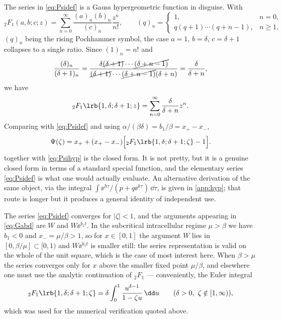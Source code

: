 The series in \cref{eq:Psidef} is a Gauss hypergeometric function in disguise. With
\begin{equation}
\label{eq:2F1def}
{}_2F_1(a,b;c;z) = \sum^\infty_{n=0}\frac{(a)_n(b)_n}{(c)_n}\frac{z^n}{n!},
\qquad
(q)_n = \begin{cases} 1, & n=0,\\ q(q+1)\cdots(q+n-1), & n\ge1,\end{cases}
\end{equation}
$(q)_n$ being the rising Pochhammer symbol, the case $a=1$, $b=\delta$, $c=\delta+1$
collapses to a single ratio. Since $(1)_n = n!$ and
\begin{equation}
\label{eq:pochcancel}
\frac{(\delta)_n}{(\delta+1)_n}
= \frac{\delta\cancel{(\delta+1)}\cdots\cancel{(\delta+n-1)}}{\cancel{(\delta+1)}\cdots\cancel{(\delta+n-1)}(\delta+n)}
= \frac{\delta}{\delta+n},
\end{equation}
we have
\begin{equation}
\label{eq:2F1simple}
{}_2F_1\lrb{1,\delta;\delta+1;z} = \sum_{n=0}^{\infty}\frac{\delta}{\delta+n}z^n .
\end{equation}
Comparing with \cref{eq:Psidef} and using $\alpha/(\beta\delta) = b_1/\beta = x_+-x_-$,
\begin{equation}
\label{eq:Psihyp}
\Psi(\zeta) = x_+ + (x_+-x_-)\Bigl[{}_2F_1\lrb{1,\delta;\delta+1;\zeta} - 1\Bigr].
\end{equation}
 together with \cref{eq:Psihyp} is the closed form. It is not pretty,
but it is a genuine closed form in terms of a standard special function, and the
elementary series \cref{eq:Psidef} is what one would actually evaluate. An
alternative derivation of the same object, via the integral
$\int\ee^{h\tau}/(p+q\ee^{k\tau})\,\dd\tau$, is given in \cref{app:hyp}; that route
is longer but it produces a general identity of independent use.

\begin{remark}
\label{rem:domain}
The series \cref{eq:Psidef} converges for $|\zeta|<1$, and the arguments appearing in
\cref{eq:Gabd} are $W$ and $W\ee^{b_1t}$. In the subcritical intracellular regime
$\mu>\beta$ we have $b_1<0$ and $x_-=\mu/\beta>1$, so for $x\in[0,1]$ the argument
$W$ lies in $[0,\beta/\mu]\subset[0,1)$ and $W\ee^{b_1t}$ is smaller still: the
series representation is valid on the whole of the unit square, which is the case of
most interest here. When $\beta>\mu$ the series converges only for $x$ above the
smaller fixed point $\mu/\beta$, and elsewhere one must use the analytic continuation
of ${}_2F_1$ --- conveniently, the Euler integral
\begin{equation*}
{}_2F_1\lrb{1,\delta;\delta+1;\zeta} = \delta\int_0^1 \frac{u^{\delta-1}}{1-\zeta u}\,\dd u
\qquad (\delta>0,\ \zeta\notin[1,\infty)),
\end{equation*}
which was used for the numerical verification quoted above.
\end{remark}

